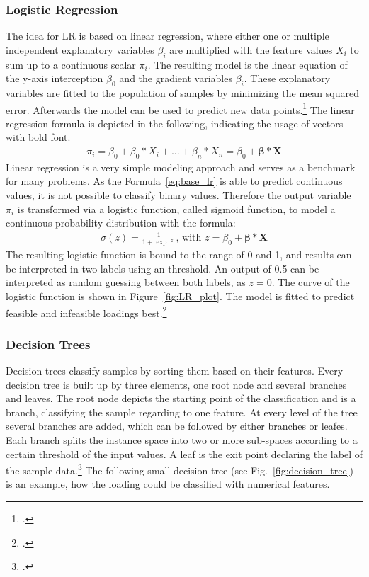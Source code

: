 \subsubsection{Logistic Regression}

The idea for \gls{LR} is based on linear regression, where either one or multiple independent explanatory
variables $\beta_i$ are multiplied with the feature values $X_i$ to sum up to a continuous scalar $\pi_i$.
The resulting model is the linear equation of the y-axis interception $\beta_0$
and the gradient variables $\beta_i$.
These explanatory variables are fitted to the population of samples by minimizing the mean squared
error. Afterwards the model can be used to predict new data points.\footcite[cf.][pp. 6-7]{nasteski_overview_2017}
The linear regression formula is depicted in the following, indicating the usage of vectors with bold font.
\begin{align}
    \pi_i=\beta_0+\beta_0*X_i+\dots+\beta_n*X_n = \beta_0 + \bm{\beta} * \bm{X}
    \label{eq:base_lr}
\end{align}
Linear regression is a very simple modeling approach and serves as a benchmark for many problems. As the Formula~\ref{eq:base_lr} is able to predict continuous
values, it is not possible to classify binary values. Therefore the output variable $\pi_i$ is transformed via a logistic function, called sigmoid function,
to model a continuous probability distribution with the formula:
\begin{align}
    \sigma(z)=\frac{1}{1+\exp^{-z}},\, \text{with } z = \beta_0 + \bm{\beta} * \bm{X}
    \label{eq:logistic_func}
\end{align}
The resulting logistic function is bound to the range of 0 and 1, and results can be interpreted
in two labels using an threshold. An output of 0.5 can be interpreted as random
guessing between both labels, as $z=0$. The curve of the logistic function is shown in Figure~\ref{fig:LR_plot}.
The model is fitted to predict feasible and infeasible loadings best.\footcite[cf.][]{kirasich_random_2018}



\subsubsection{Decision Trees}
Decision trees classify samples by sorting them based on their features. Every decision tree
is built up by three elements, one root node and several branches and leaves. The root node
depicts the starting point of the classification and is a branch, classifying the sample
regarding to one feature. At every level of the tree several branches are added, which can be followed
by either branches or leafes. Each branch splits the instance space into two or more sub-spaces
according to a certain threshold of the input values. A leaf is the exit point declaring
the label of the sample data.\footcite[cf.][p.5-6]{nasteski_overview_2017}
The following small decision tree (see Fig.~\ref{fig:decision_tree}) is an example,
how the loading could be classified with numerical features.

